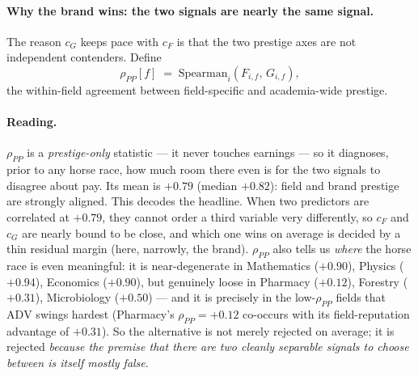 \documentclass[11pt]{article}
\begin{document}
\paragraph{Why the brand wins: the two signals are nearly the same signal.} The reason $c_G$ keeps pace with $c_F$ is that the two prestige axes are not independent contenders. Define
\[
\rho_{PP}[f] \;=\; \mathrm{Spearman}_i\!\left(F_{i,f},\, G_{i,f}\right),
\]
the within-field agreement between field-specific and academia-wide prestige.

\paragraph{Reading.} $\rho_{PP}$ is a \emph{prestige-only} statistic --- it never touches earnings --- so it diagnoses, prior to any horse race, how much room there even is for the two signals to disagree about pay. Its mean is $+0.79$ (median $+0.82$): field and brand prestige are strongly aligned. This decodes the headline. When two predictors are correlated at $+0.79$, they cannot order a third variable very differently, so $c_F$ and $c_G$ are nearly bound to be close, and which one wins on average is decided by a thin residual margin (here, narrowly, the brand). $\rho_{PP}$ also tells us \emph{where} the horse race is even meaningful: it is near-degenerate in Mathematics ($+0.90$), Physics ($+0.94$), Economics ($+0.90$), but genuinely loose in Pharmacy ($+0.12$), Forestry ($+0.31$), Microbiology ($+0.50$) --- and it is precisely in the low-$\rho_{PP}$ fields that $\mathrm{ADV}$ swings hardest (Pharmacy's $\rho_{PP}=+0.12$ co-occurs with its field-reputation advantage of $+0.31$). So the alternative is not merely rejected on average; it is rejected \emph{because the premise that there are two cleanly separable signals to choose between is itself mostly false}.
\end{document}
